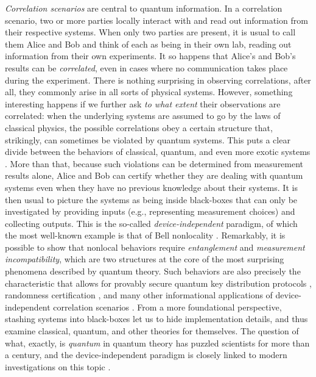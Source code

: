 \emph{Correlation scenarios} are central to quantum information. In a correlation scenario, two or more parties locally interact with and read out information from their respective systems. When only two parties are present, it is usual to call them Alice and Bob and think of each as being in their own lab, reading out information from their own experiments. It so happens that Alice's and Bob's results can be \emph{correlated}, even in cases where no communication takes place during the experiment. There is nothing surprising in observing correlations, after all, they commonly arise in all sorts of physical systems. However, something interesting happens if we further ask \emph{to what extent} their observations are correlated: when the underlying systems are assumed to go by the laws of classical physics, the possible correlations obey a certain structure that, strikingly, can sometimes be violated by quantum systems. This puts a clear divide between the behaviors of classical, quantum, and even more exotic systems \cite{prbox}. More than that, because such violations can be determined from measurement results alone, Alice and Bob can certify whether they are dealing with quantum systems even when they have no previous knowledge about their systems. It is then usual to picture the systems as being inside black-boxes that can only be investigated by providing inputs (e.g., representing measurement choices) and collecting outputs. This is the so-called \emph{device-independent} paradigm, of which the most well-known example is that of Bell nonlocality \cite{brunner_2014_nonlocality}. Remarkably, it is possible to show that nonlocal behaviors require \emph{entanglement} and \emph{measurement incompatibility}, which are two structures at the core of the most surprising phenomena described by quantum theory. %
Such behaviors are also precisely the characteristic that allows for provably secure quantum key distribution protocols \cite{ekert91}, randomness certification \cite{}, and many other informational applications of device-independent correlation scenarios \cite{brunner_2014_nonlocality}. From a more foundational perspective, stashing systems into black-boxes let us to hide implementation details, and thus examine classical, quantum, and other theories for themselves. The question of what, exactly, is \emph{quantum} in quantum theory has puzzled scientists for more than a century, and the device-independent paradigm is closely linked to modern investigations on this topic \cite{barrett_gpts_2007,plavala_gpts_2021,spekkens_2005_contextuality}.  

